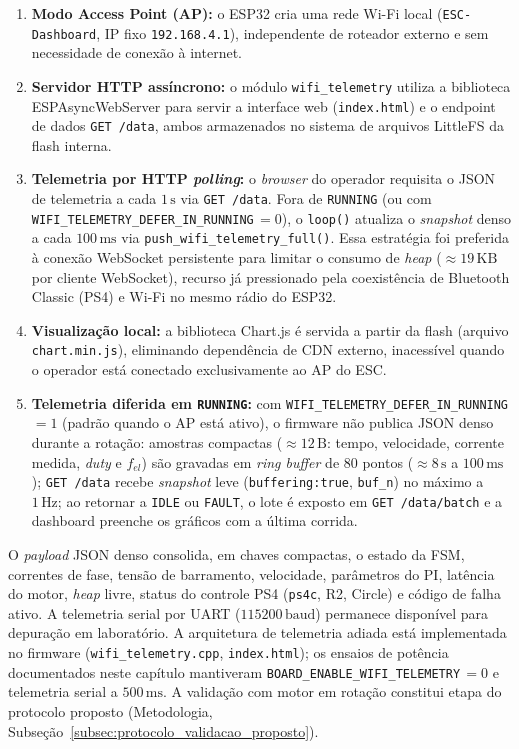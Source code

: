 \begin{enumerate}
    \item \textbf{Modo Access Point (AP):} o ESP32 cria uma rede Wi-Fi local (\texttt{ESC-Dashboard}, IP fixo \texttt{192.168.4.1}), independente de roteador externo e sem necessidade de conexão à internet.
    \item \textbf{Servidor HTTP assíncrono:} o módulo \texttt{wifi\_telemetry} utiliza a biblioteca ESPAsyncWebServer para servir a interface web (\texttt{index.html}) e o endpoint de dados \texttt{GET /data}, ambos armazenados no sistema de arquivos LittleFS da flash interna.
    \item \textbf{Telemetria por HTTP \textit{polling}:} o \textit{browser} do operador requisita o JSON de telemetria a cada $1\,\text{s}$ via \texttt{GET /data}. Fora de \texttt{RUNNING} (ou com \texttt{WIFI\_TELEMETRY\_DEFER\_IN\_RUNNING}\,$= 0$), o \texttt{loop()} atualiza o \textit{snapshot} denso a cada $100\,\text{ms}$ via \texttt{push\_wifi\_telemetry\_full()}. Essa estratégia foi preferida à conexão WebSocket persistente para limitar o consumo de \textit{heap} ($\approx 19\,\text{KB}$ por cliente WebSocket), recurso já pressionado pela coexistência de Bluetooth Classic (PS4) e Wi-Fi no mesmo rádio do ESP32.
    \item \textbf{Visualização local:} a biblioteca Chart.js é servida a partir da flash (arquivo \texttt{chart.min.js}), eliminando dependência de CDN externo, inacessível quando o operador está conectado exclusivamente ao AP do ESC.
    \item \textbf{Telemetria diferida em \texttt{RUNNING}:} com \texttt{WIFI\_TELEMETRY\_DEFER\_IN\_RUNNING}\,$= 1$ (padrão quando o AP está ativo), o firmware não publica JSON denso durante a rotação: amostras compactas ($\approx 12\,\text{B}$: tempo, velocidade, corrente medida, \textit{duty} e $f_{el}$) são gravadas em \textit{ring buffer} de $80$ pontos ($\approx 8\,\text{s}$ a $100\,\text{ms}$); \texttt{GET /data} recebe \textit{snapshot} leve (\texttt{buffering:true}, \texttt{buf\_n}) no máximo a $1\,\text{Hz}$; ao retornar a \texttt{IDLE} ou \texttt{FAULT}, o lote é exposto em \texttt{GET /data/batch} e a dashboard preenche os gráficos com a última corrida.
\end{enumerate}

O \textit{payload} JSON denso consolida, em chaves compactas, o estado da FSM, correntes de fase, tensão de barramento, velocidade, parâmetros do PI, latência do motor, \textit{heap} livre, status do controle PS4 (\texttt{ps4c}, R2, Circle) e código de falha ativo. A telemetria serial por UART ($115200\,\text{baud}$) permanece disponível para depuração em laboratório. A arquitetura de telemetria adiada está implementada no firmware (\texttt{wifi\_telemetry.cpp}, \texttt{index.html}); os ensaios de potência documentados neste capítulo mantiveram \texttt{BOARD\_ENABLE\_WIFI\_TELEMETRY}\,$= 0$ e telemetria serial a $500\,\text{ms}$. A validação com motor em rotação constitui etapa do protocolo proposto (Metodologia, Subseção~\ref{subsec:protocolo_validacao_proposto}).


